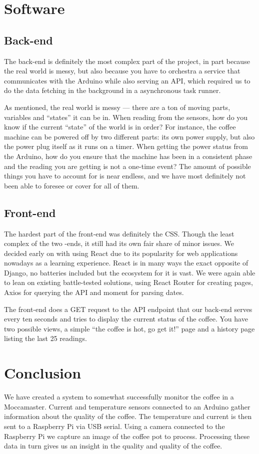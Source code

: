 \documentclass[12pt,a4paper,oneside,article]{memoir}
\numberwithin{equation}{chapter}
\begin{document}
\section{Software}\label{sec:software}
\subsection{Back-end}\label{sec:back-end}
The back-end is definitely the most complex part of the project, in part because
the real world is messy, but also because you have to orchestra a service that
communicates with the Arduino while also serving an API, which required us to do
the data fetching in the background in a asynchronous task runner.

As mentioned, the real world is messy --- there are a ton of moving parts,
variables and ``states'' it can be in. When reading from the sensors, how do you
know if the current ``state'' of the world is in order? For instance, the coffee
machine can be powered off by two different parts: its own power supply, but
also the power plug itself as it runs on a timer. When getting the power status
from the Arduino, how do you ensure that the machine has been in a consistent
phase and the reading you are getting is not a one-time event? The amount of
possible things you have to account for is near endless, and we have most
definitely not been able to foresee or cover for all of them.

\subsection{Front-end}\label{sec:front-end}
The hardest part of the front-end was definitely the CSS.  Though the least 
complex of the two -ends, it still had its own fair
share of minor issues. We decided early on with using React due to its
popularity for web applications nowadays as a learning experience. React is in
many ways the exact opposite of Django, no batteries included but the ecosystem
for it is vast. We were again able to lean on existing battle-tested solutions,
using React Router for creating pages, Axios for querying the API and moment for
parsing dates.

The front-end does a GET request to the API endpoint that our back-end serves
every ten seconds and tries to display the current status of the coffee. You
have two possible views, a simple ``the coffee is hot, go get it!'' page and a
history page listing the last 25 readings.

\section{Conclusion}\label{sec:conclusion}
We have created a system to somewhat successfully monitor the coffee in a 
Moccamaster. %
Current and temperature sensors connected to an Arduino gather information about 
the quality of the coffee. The temperature and current is then sent to a 
Raspberry Pi via USB serial. Using a camera connected to the Raspberry Pi we 
capture an image of the coffee pot to process. Processing these data in 
turn gives us an insight in the quality and quality of the coffee.
\end{document}
